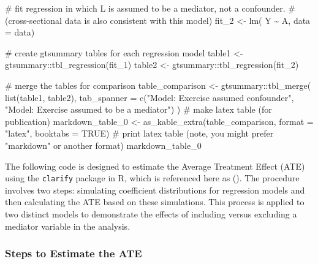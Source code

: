 \documentclass[
  singlecolumn]{article}
\newenvironment{Shaded}{}{}
\newcommand{\AttributeTok}[1]{\textcolor[rgb]{0.84,0.23,0.29}{#1}}
\newcommand{\CommentTok}[1]{\textcolor[rgb]{0.42,0.45,0.49}{#1}}
\newcommand{\ConstantTok}[1]{\textcolor[rgb]{0.00,0.36,0.77}{#1}}
\newcommand{\FunctionTok}[1]{\textcolor[rgb]{0.44,0.26,0.76}{#1}}
\newcommand{\NormalTok}[1]{\textcolor[rgb]{0.14,0.16,0.18}{#1}}
\newcommand{\OtherTok}[1]{\textcolor[rgb]{0.44,0.26,0.76}{#1}}
\newcommand{\SpecialCharTok}[1]{\textcolor[rgb]{0.00,0.36,0.77}{#1}}
\newcommand{\StringTok}[1]{\textcolor[rgb]{0.01,0.18,0.38}{#1}}
\begin{document}
\begin{Shaded}
\begin{Highlighting}[]
\CommentTok{\# fit regression in which L is assumed to be a mediator, not a confounder.}
\CommentTok{\# (cross{-}sectional data is also consistent with this model)}
\NormalTok{fit\_2 }\OtherTok{\textless{}{-}} \FunctionTok{lm}\NormalTok{( Y }\SpecialCharTok{\textasciitilde{}}\NormalTok{ A, }\AttributeTok{data =}\NormalTok{ data)}

\CommentTok{\# create gtsummary tables for each regression model}
\NormalTok{table1 }\OtherTok{\textless{}{-}}\NormalTok{ gtsummary}\SpecialCharTok{::}\FunctionTok{tbl\_regression}\NormalTok{(fit\_1)}
\NormalTok{table2 }\OtherTok{\textless{}{-}}\NormalTok{ gtsummary}\SpecialCharTok{::}\FunctionTok{tbl\_regression}\NormalTok{(fit\_2)}

\CommentTok{\# merge the tables for comparison}
\NormalTok{table\_comparison }\OtherTok{\textless{}{-}}\NormalTok{ gtsummary}\SpecialCharTok{::}\FunctionTok{tbl\_merge}\NormalTok{(}
  \FunctionTok{list}\NormalTok{(table1, table2),}
  \AttributeTok{tab\_spanner =} \FunctionTok{c}\NormalTok{(}\StringTok{"Model: Exercise assumed confounder"}\NormalTok{, }
                  \StringTok{"Model: Exercise assumed to be a mediator"}\NormalTok{)}
\NormalTok{)}
\CommentTok{\# make latex table (for publication)}
\NormalTok{markdown\_table\_0 }\OtherTok{\textless{}{-}} \FunctionTok{as\_kable\_extra}\NormalTok{(table\_comparison, }
                                   \AttributeTok{format =} \StringTok{"latex"}\NormalTok{, }
                                   \AttributeTok{booktabs =} \ConstantTok{TRUE}\NormalTok{)}
\CommentTok{\# print latex table (note, you might prefer "markdown" or another format)                                }
\NormalTok{markdown\_table\_0}
\end{Highlighting}
\end{Shaded}

The following code is designed to estimate the Average Treatment Effect
(ATE) using the \texttt{clarify} package in R, which is referenced here
as (). The
procedure involves two steps: simulating coefficient distributions for
regression models and then calculating the ATE based on these
simulations. This process is applied to two distinct models to
demonstrate the effects of including versus excluding a mediator
variable in the analysis.

\subsubsection{Steps to Estimate the
ATE}\label{steps-to-estimate-the-ate}
\end{document}
